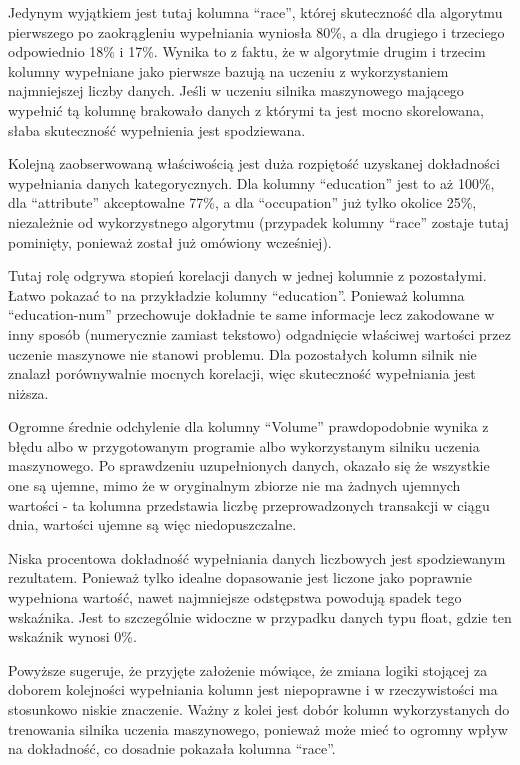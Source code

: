 \documentclass[12pt,twoside]{article}
\begin{document}
Jedynym wyjątkiem jest tutaj kolumna ``race'',
której skuteczność dla algorytmu pierwszego po zaokrągleniu wypełniania wyniosła 80\%,
a dla drugiego i trzeciego odpowiednio 18\% i 17\%.
Wynika to z faktu, że w algorytmie drugim i trzecim kolumny wypełniane jako pierwsze
bazują na uczeniu z wykorzystaniem najmniejszej liczby danych.
Jeśli w uczeniu silnika maszynowego mającego wypełnić tą kolumnę brakowało danych z którymi ta jest mocno skorelowana,
słaba skuteczność wypełnienia jest spodziewana.



Kolejną zaobserwowaną właściwością jest duża rozpiętość uzyskanej dokładności wypełniania danych kategorycznych.
Dla kolumny ``education'' jest to aż 100\%, dla ``attribute'' akceptowalne 77\%,
a dla ``occupation'' już tylko okolice 25\%, niezależnie od wykorzystnego algorytmu
(przypadek kolumny ``race'' zostaje tutaj pominięty, ponieważ został już omówiony wcześniej).

Tutaj rolę odgrywa stopień korelacji danych w jednej kolumnie z pozostałymi.
Łatwo pokazać to na przykładzie kolumny ``education''.
Ponieważ kolumna ``education-num'' przechowuje dokładnie te same informacje lecz zakodowane w inny sposób
(numerycznie zamiast tekstowo) odgadnięcie właściwej wartości przez uczenie maszynowe nie stanowi problemu.
Dla pozostałych kolumn silnik nie znalazł porównywalnie mocnych korelacji,
więc skuteczność wypełniania jest niższa.

Ogromne średnie odchylenie dla kolumny ``Volume'' prawdopodobnie wynika z błędu albo w przygotowanym programie albo
wykorzystanym silniku uczenia maszynowego. Po sprawdzeniu uzupełnionych danych, okazało się że wszystkie one są ujemne,
mimo że w oryginalnym zbiorze nie ma żadnych ujemnych wartości - ta kolumna przedstawia liczbę przeprowadzonych
transakcji w ciągu dnia, wartości ujemne są więc niedopuszczalne.

Niska procentowa dokładność wypełniania danych liczbowych jest spodziewanym rezultatem.
Ponieważ tylko idealne dopasowanie jest liczone jako poprawnie wypełniona wartość, nawet najmniejsze odstępstwa
powodują spadek tego wskaźnika. Jest to szczególnie widoczne w przypadku danych typu float, gdzie ten wskaźnik wynosi 0\%.

Powyższe sugeruje, że przyjęte założenie mówiące, że zmiana logiki stojącej za doborem kolejności wypełniania kolumn
jest niepoprawne i w rzeczywistości ma stosunkowo niskie znaczenie.
Ważny z kolei jest dobór kolumn wykorzystanych do trenowania silnika uczenia maszynowego,
ponieważ może mieć to ogromny wpływ na dokładność, co dosadnie pokazała kolumna ``race''.
\end{document}
